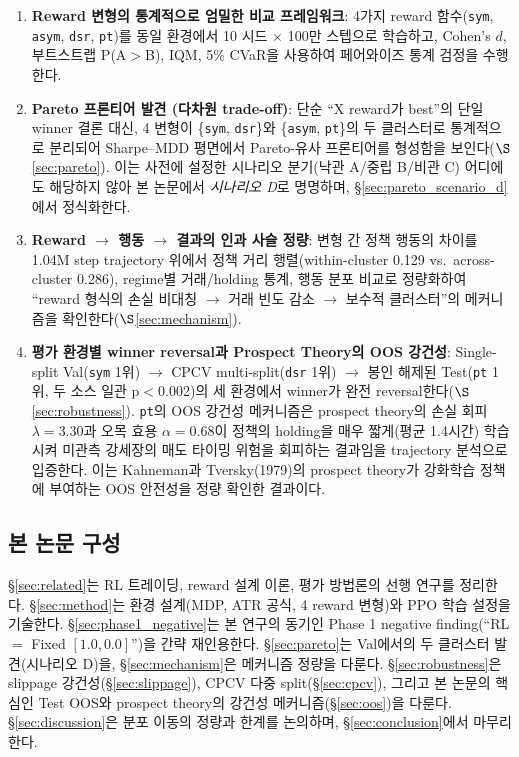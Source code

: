 \documentclass[11pt, a4paper]{article}
\begin{document}
\begin{enumerate}[leftmargin=*]
\item \textbf{Reward 변형의 통계적으로 엄밀한 비교 프레임워크}: 4가지 reward
함수(\texttt{sym}, \texttt{asym}, \texttt{dsr}, \texttt{pt})를 동일 환경에서
10 시드 $\times$ 100만 스텝으로 학습하고, Cohen's $d$, 부트스트랩 P(A$>$B), IQM,
5\% CVaR을 사용하여 페어와이즈 통계 검정을 수행한다.
\item \textbf{Pareto 프론티어 발견 (다차원 trade-off)}: 단순 ``X reward가 best''의
단일 winner 결론 대신, 4 변형이 \{\texttt{sym}, \texttt{dsr}\}와
\{\texttt{asym}, \texttt{pt}\}의 두 클러스터로 통계적으로 분리되어 Sharpe--MDD
평면에서 Pareto-유사 프론티어를 형성함을 보인다($\S$\ref{sec:pareto}). 이는 사전에
설정한 시나리오 분기(낙관 A/중립 B/비관 C) 어디에도 해당하지 않아 본 논문에서
\emph{시나리오 D}로 명명하며, \S\ref{sec:pareto_scenario_d}에서 정식화한다.
\item \textbf{Reward $\to$ 행동 $\to$ 결과의 인과 사슬 정량}: 변형 간 정책 행동의
차이를 1.04M step trajectory 위에서 정책 거리 행렬(within-cluster 0.129 vs.\
across-cluster 0.286), regime별 거래/holding 통계, 행동 분포 비교로 정량화하여
``reward 형식의 손실 비대칭 $\to$ 거래 빈도 감소 $\to$ 보수적 클러스터''의 메커니즘을
확인한다($\S$\ref{sec:mechanism}).
\item \textbf{평가 환경별 winner reversal과 Prospect Theory의 OOS 강건성}:
Single-split Val(\texttt{sym} 1위) $\to$ CPCV multi-split(\texttt{dsr} 1위) $\to$
봉인 해제된 Test(\texttt{pt} 1위, 두 소스 일관 p$<$0.002)의 세 환경에서 winner가
완전 reversal한다($\S$\ref{sec:robustness}). \texttt{pt}의 OOS 강건성 메커니즘은
prospect theory의 손실 회피 $\lambda=3.30$과 오목 효용 $\alpha=0.68$이 정책의
holding을 매우 짧게(평균 1.4시간) 학습시켜 미관측 강세장의 매도 타이밍 위험을
회피하는 결과임을 trajectory 분석으로 입증한다. 이는 Kahneman과 Tversky(1979)의
prospect theory가 강화학습 정책에 부여하는 OOS 안전성을 정량 확인한 결과이다.
\end{enumerate}

\subsection{본 논문 구성}
\label{sec:intro_structure}

\S\ref{sec:related}는 RL 트레이딩, reward 설계 이론, 평가 방법론의 선행 연구를
정리한다. \S\ref{sec:method}는 환경 설계(MDP, ATR 공식, 4 reward 변형)와 PPO 학습
설정을 기술한다. \S\ref{sec:phase1_negative}는 본 연구의 동기인 Phase 1 negative
finding(``RL $=$ Fixed $[1.0, 0.0]$'')을 간략 재인용한다. \S\ref{sec:pareto}는
Val에서의 두 클러스터 발견(시나리오 D)을, \S\ref{sec:mechanism}은 메커니즘 정량을
다룬다. \S\ref{sec:robustness}은 slippage 강건성(\S\ref{sec:slippage}), CPCV
다중 split(\S\ref{sec:cpcv}), 그리고 본 논문의 핵심인 Test OOS와
prospect theory의 강건성 메커니즘(\S\ref{sec:oos})을 다룬다. \S\ref{sec:discussion}은
분포 이동의 정량과 한계를 논의하며, \S\ref{sec:conclusion}에서 마무리한다.
\end{document}
